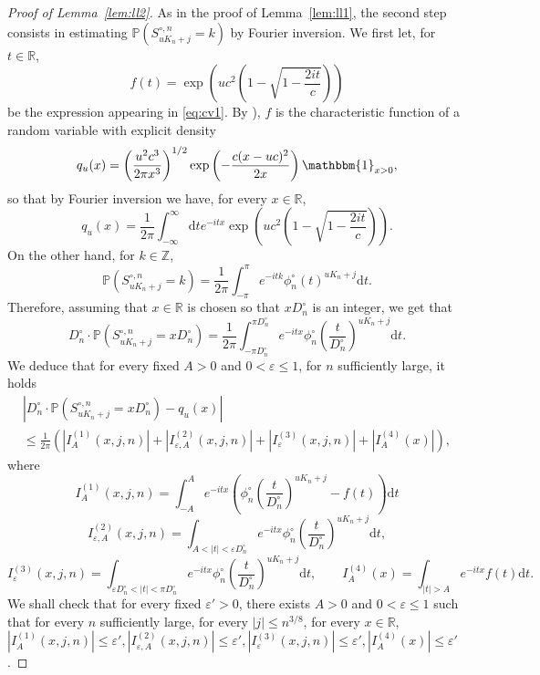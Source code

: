 \documentclass[AHL,XML,longabstracts,Unicode]{cedram}
\newcommand{\R}{\mathbb{R}}
\def\Scn{S^{\circ,n}}
\def\phicn{\phi^{\circ}_{n}}
\def\Dcn{D^{\circ}_{n}}
\renewcommand{\epsilon}{\varepsilon}
\renewcommand\Pr[1]{\mathbb{P}\left(#1\right)}
\begin{document}
\begin{proof}[Proof of Lemma~\ref{lem:ll2}]
 As in the proof of Lemma~\ref{lem:ll1}, the second step consists in estimating $\Pr{\Scn_{ uK_{n}  +j}=k}$ by Fourier inversion.
 We first let, for $t \in \mathbb{R}$,
\[f(t)=\exp \left( u c^{2} \left( 1 -\sqrt{1-  \frac{2it}{c}}  \right)  \right)\]
be the expression appearing in \eqref{eq:cv1}.
By \cite[Sec.1.2.5]{Kyp06}),  $f$ is the characteristic function of a random variable with explicit density
\[q_u(x)=\left( \frac{u^{2} c^{3}}{2 \pi x^{3}} \right)^{1/2} \exp \left(  - \frac{c (x-uc)^{2} }{2x} \right) \mathbbm{1}_{x>0},\]
so that by Fourier inversion we have, for every $x \in \mathbb{R}$,
\begin{equation}
 \label{eq:fourier}
 q_u(x)=  \frac{1}{2\pi}\int_{-\infty}^{\infty}  {\mathrm{d}t} e^{-itx} \exp \left( u c^{2} \left( 1 -\sqrt{1-  \frac{2it}{c}}  \right)  \right).
 \end{equation}
On the other hand,
for $k \in \mathbb{Z}$,
\[ \Pr{\Scn_{ uK_{n}  +j}=k} = \frac{1}{2\pi} \int_{-\pi}^{\pi} e^{-itk} \phicn(t)^{ uK_{n}  +j} {\mathrm{d}}t.\]
Therefore, assuming that $x \in \R$ is chosen so that $x \Dcn$ is an integer, we get that
\[ \Dcn \cdot \Pr{\Scn_{ uK_{n}  +j}=x  \Dcn}=  \frac{1}{2\pi} \int^{\pi \Dcn}_{-\pi \Dcn} e^{- i t x} \phicn \left(  \frac{t}{\Dcn} \right) ^{ uK_{n}  +j} {\mathrm{d}}t.\]
We deduce that for every fixed $A>0$ and $0< \epsilon \leq 1$, for $n$ sufficiently large, it holds
\begin{multline*}
  \left| \Dcn \cdot \Pr{\Scn_{ uK_{n}  +j}=x  \Dcn} - q_{u}(x)\right| \\
  \leq \frac{1}{2 \pi} (|I^{(1)}_{A}(x,j,n)| + |I^{(2)}_{\epsilon,A}(x,j,n)|+|I^{(3)}_{\epsilon}(x,j,n)|+|I^{(4)}_{A}(x)|),
\end{multline*}
where
\[I^{(1)}_{A}(x,j,n)=\int_{-A}^{A} e^{-i t x} \left(  \phicn \left(  \frac{t}{\Dcn} \right) ^{ uK_{n}  +j}- f(t) \right) {\mathrm{d}}t\]
\[ I^{(2)}_{\epsilon,A}(x,j,n)= \int_{A<|t|< \epsilon \Dcn} e^{-itx} \phicn \left(  \frac{t}{\Dcn} \right) ^{ uK_{n}  +j}{\mathrm{d}}t,\]
\[ I^{(3)}_{\epsilon}(x,j,n)=\int_{\epsilon \Dcn<|t|<\pi \Dcn} e^{-itx} \phicn  \left(  \frac{t}{\Dcn} \right) ^{ uK_{n}  +j} {\mathrm{d}}t, \qquad I^{(4)}_{A}(x)= \int_{|t|>A} e^{-itx} f(t) {\mathrm{d}}t .\]
We shall check that for every fixed $\epsilon'>0$, there exists $A>0$ and $0 < \epsilon \leq 1$ such that for every $n$ sufficiently large, for every $|j| \leq n^{3/8}$, for every $x \in \R$,
 $|I^{(1)}_{A}(x,j,n)| \leq \epsilon', |I^{(2)}_{\epsilon,A}(x,j,n)| \leq \epsilon', |I^{(3)}_{\epsilon}(x,j,n)| \leq \epsilon', |I^{(4)}_{A}(x)| \leq\epsilon'$.



\end{proof}
\end{document}
